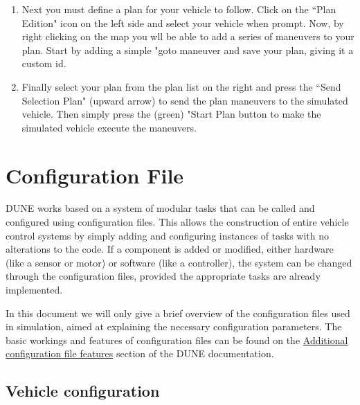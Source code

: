 \documentclass[10pt,a4paper]{article}
\begin{document}
\begin{enumerate}
\item Next you must define a plan for your vehicle to follow. Click on the ``Plan Edition" icon on the left side and select your vehicle when prompt. Now, by right clicking on the map you wll be able to add a series of maneuvers to your plan. Start by adding a simple "goto maneuver and save your plan, giving it a custom id.

\item Finally select your plan from the plan list on the right and press the ``Send Selection Plan" (upward arrow) to send the plan maneuvers to the simulated vehicle. Then simply press the (green) "Start Plan button to make the simulated vehicle execute the maneuvers. 
\fi
\end{enumerate}

\section{Configuration File}
\label{configuration_file}

\par DUNE works based on a system of modular tasks that can be called and configured using configuration  files. This allows the construction of entire vehicle control systems by simply adding and configuring instances of tasks with no alterations to the code. If a component is added or modified, either hardware (like a sensor or motor) or software (like a controller), the system can be changed through the configuration files, provided the appropriate tasks are already implemented.  

\par In this document we will only give a brief overview of the configuration files used in simulation, aimed at explaining the necessary configuration parameters. The basic workings and features of configuration files can be found on the \href{https://github.com/LSTS/dune/wiki/Additional-configuration-file-features}{Additional configuration file features} section of the DUNE documentation.

\subsection{Vehicle configuration}
\end{document}
